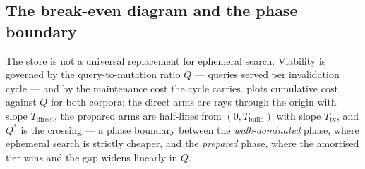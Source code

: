 \documentclass[11pt,letterpaper]{article}
\begin{document}
\subsection{The break-even diagram and the phase boundary}
The store is not a universal replacement for ephemeral search. Viability is
governed by the query-to-mutation ratio $Q$ --- queries served per
invalidation cycle --- and by the maintenance cost the cycle carries.
 plots cumulative cost against $Q$ for both corpora: the
direct arms are rays through the origin with slope $T_{\text{direct}}$, the
prepared arms are half-lines from $(0,T_{\text{build}})$ with slope
$T_{\text{tv}}$, and $Q^{*}$ is the crossing --- a phase boundary between
the \emph{walk-dominated} phase, where ephemeral search is strictly
cheaper, and the \emph{prepared} phase, where the amortised tier wins and
the gap widens linearly in $Q$.
\end{document}
